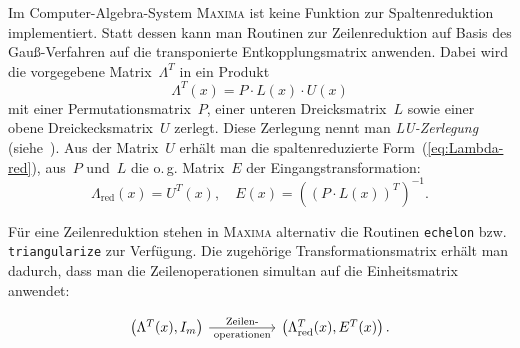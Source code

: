 \begin{remark}
\label{rem:Spaltenreduktion-maxima}Im Computer-Algebra-System \textsc{Maxima}
ist keine Funktion zur Spaltenreduktion implementiert. Statt dessen
kann man Routinen zur Zeilenreduktion auf Basis des Gauß-Verfahren
auf die transponierte Entkopplungsmatrix anwenden. Dabei wird die
vorgegebene Matrix~$\Lambda^{T}$ in ein Produkt 
\[
\Lambda^{T}(x)=P\cdot L(x)\cdot U(x)
\]
mit einer Permutationsmatrix~$P$, einer unteren Dreicksmatrix~$L$
sowie einer obene Dreickecksmatrix~$U$ zerlegt. Diese Zerlegung
nennt man \emph{LU-Zerlegung} (siehe~\cite{beutelspacher2001}).
Aus der Matrix~$U$ erhält man die spaltenreduzierte Form~(\ref{eq:Lambda-red}),
aus~$P$ und~$L$ die o.\,g. Matrix~$E$ der Eingangstransformation:
\[
\Lambda_{\text{red}}(x)=U^{T}(x),\quad E(x)=\left((P\cdot L(x))^{T}\right)^{-1}.
\]

Für eine Zeilenreduktion stehen in \textsc{Maxima} alternativ die
Routinen \texttt{echelon} bzw. \texttt{triangularize} zur Verfügung.
Die zugehörige Transformationsmatrix erhält man dadurch, dass man
die Zeilenoperationen simultan auf die Einheitsmatrix anwendet:
\end{remark}
\[
\begin{tikzcd}
\left(\Lambda^T(x),I_m\right)
\arrow{rr}[above]{\text{Zeilen-}}[below]{\text{operationen}} && 
\left(\Lambda^T_\text{red}(x),E^T(x)
\right).
\end{tikzcd}
\]

